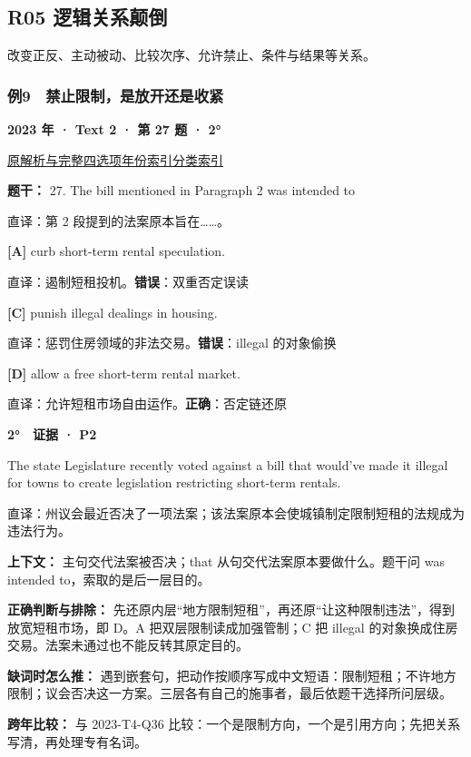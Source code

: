 \documentclass[11pt,a4paper]{article}
\begin{document}
\subsection{R05 逻辑关系颠倒}
改变正反、主动被动、比较次序、允许禁止、条件与结果等关系。

\subsubsection{例9　禁止限制，是放开还是收紧}\label{case-2023-T2-Q27}
\noindent\textbf{2023 年 · Text 2 · 第 27 题 · 2°}\par\noindent \href{https://zj139.github.io/math-notes/english/7985b9c2edc65f70cf714232/\#q27}{原解析与完整四选项}\quad \hyperref[idx-2023-T2-Q27]{年份索引}\quad \hyperref[class-R05]{分类索引}\par\smallskip
\noindent\textbf{题干：} 27. The bill mentioned in Paragraph 2 was intended to\par\smallskip
直译：第 2 段提到的法案原本旨在……。

\noindent\textbf{[A]} curb short-term rental speculation.\par\nopagebreak
\noindent 直译：遏制短租投机。\quad\textbf{错误}：双重否定误读\par\smallskip
{}\noindent\textbf{[C]} punish illegal dealings in housing.\par\nopagebreak
\noindent 直译：惩罚住房领域的非法交易。\quad\textbf{错误}：illegal 的对象偷换\par\smallskip
{}\noindent\textbf{[D]} allow a free short-term rental market.\par\nopagebreak
\noindent 直译：允许短租市场自由运作。\quad\textbf{正确}：否定链还原\par\smallskip
\begin{evidence}\textbf{2°　证据 · P2}\par The state Legislature recently voted against a bill that would’ve made it illegal for towns to create legislation restricting short-term rentals.\par 直译：州议会最近否决了一项法案；该法案原本会使城镇制定限制短租的法规成为违法行为。\end{evidence}
\noindent\textbf{上下文：} 主句交代法案被否决；that 从句交代法案原本要做什么。题干问 was intended to，索取的是后一层目的。\par\smallskip
\noindent\textbf{正确判断与排除：} 先还原内层“地方限制短租”，再还原“让这种限制违法”，得到放宽短租市场，即 D。A 把双层限制读成加强管制；C 把 illegal 的对象换成住房交易。法案未通过也不能反转其原定目的。\par\smallskip
\noindent\textbf{缺词时怎么推：} 遇到嵌套句，把动作按顺序写成中文短语：限制短租；不许地方限制；议会否决这一方案。三层各有自己的施事者，最后依题干选择所问层级。\par\smallskip
\noindent\textbf{跨年比较：} 与 2023-T4-Q36 比较：一个是限制方向，一个是引用方向；先把关系写清，再处理专有名词。\par\smallskip
\clearpage
\end{document}
